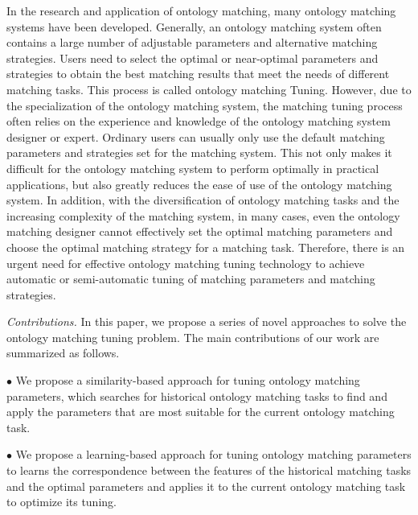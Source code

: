 \documentclass[twoside]{article}
\begin{document}
In the research and application of ontology matching, many ontology matching systems have been developed.
Generally, an ontology matching system often contains a large number of adjustable parameters and alternative matching strategies.
Users need to select the optimal or near-optimal parameters and strategies to obtain the best matching results that meet the needs of different matching tasks.
This process is called ontology matching Tuning.
However, due to the specialization of the ontology matching system, the matching tuning process often relies on the experience and knowledge of the ontology matching system designer or expert.
Ordinary users can usually only use the default matching parameters and strategies set for the matching system.
This not only makes it difficult for the ontology matching system to perform optimally in practical applications, but also greatly reduces the ease of use of the ontology matching system.
In addition, with the diversification of ontology matching tasks and the increasing complexity of the matching system, in many cases, even the ontology matching designer cannot effectively set the optimal matching parameters and choose the optimal matching strategy for a matching task.
Therefore, there is an urgent need for effective ontology matching tuning technology to achieve automatic or semi-automatic tuning of matching parameters and matching strategies.



{\it Contributions.}
In this paper, we propose a series of novel approaches to solve the ontology matching tuning problem. The main contributions of our work are summarized as follows.

$\bullet$ We propose a similarity-based approach for tuning ontology matching parameters, which searches for historical ontology matching tasks to find and apply the parameters that are most suitable for the current ontology matching task.

$\bullet$ We propose a learning-based approach for tuning ontology matching parameters to learns the correspondence between the features of the historical matching tasks and the optimal parameters and applies it to the current ontology matching task to optimize its tuning.
\end{document}
